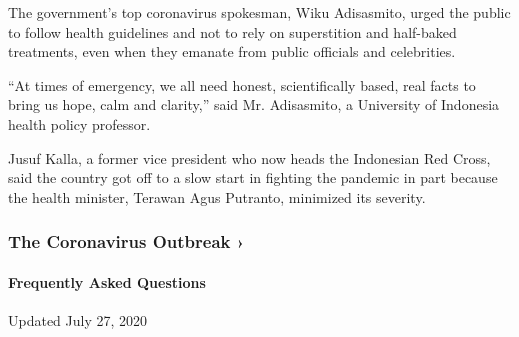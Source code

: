 The government's top coronavirus spokesman, Wiku Adisasmito, urged the
public to follow health guidelines and not to rely on superstition and
half-baked treatments, even when they emanate from public officials and
celebrities.

``At times of emergency, we all need honest, scientifically based, real
facts to bring us hope, calm and clarity,'' said Mr. Adisasmito, a
University of Indonesia health policy professor.

Jusuf Kalla, a former vice president who now heads the Indonesian Red
Cross, said the country got off to a slow start in fighting the pandemic
in part because the health minister, Terawan Agus Putranto, minimized
its severity.

\href{https://www.nytimes.com/news-event/coronavirus?action=click\&pgtype=Article\&state=default\&region=MAIN_CONTENT_3\&context=storylines_faq}{}

\hypertarget{the-coronavirus-outbreak-}{%
\subsubsection{The Coronavirus Outbreak
›}\label{the-coronavirus-outbreak-}}

\hypertarget{frequently-asked-questions}{%
\paragraph{Frequently Asked
Questions}\label{frequently-asked-questions}}

Updated July 27, 2020

